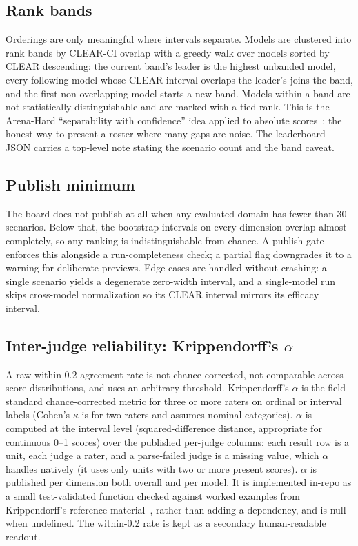 \subsection{Rank bands}

Orderings are only meaningful where intervals separate. Models are clustered into
rank bands by CLEAR-CI overlap with a greedy walk over models sorted by CLEAR
descending: the current band's leader is the highest unbanded model, every
following model whose CLEAR interval overlaps the leader's joins the band, and the
first non-overlapping model starts a new band. Models within a band are not
statistically distinguishable and are marked with a tied rank. This is the
Arena-Hard ``separability with confidence'' idea applied to absolute
scores~\cite{arenahard2024}: the honest way to present a roster where many gaps are
noise. The leaderboard JSON carries a top-level note stating the scenario count and
the band caveat.

\subsection{Publish minimum}

The board does not publish at all when any evaluated domain has fewer than 30
scenarios. Below that, the bootstrap intervals on every dimension overlap almost
completely, so any ranking is indistinguishable from chance. A publish gate
enforces this alongside a run-completeness check; a partial flag downgrades it to a
warning for deliberate previews. Edge cases are handled without crashing: a single
scenario yields a degenerate zero-width interval, and a single-model run skips
cross-model normalization so its CLEAR interval mirrors its efficacy interval.

\subsection{Inter-judge reliability: Krippendorff's $\alpha$}

A raw within-0.2 agreement rate is not chance-corrected, not comparable across
score distributions, and uses an arbitrary threshold. Krippendorff's $\alpha$ is the
field-standard chance-corrected metric for three or more raters on ordinal or
interval labels (Cohen's $\kappa$ is for two raters and assumes nominal categories).
$\alpha$ is computed at the interval level (squared-difference distance, appropriate
for continuous 0--1 scores) over the published per-judge columns: each result row
is a unit, each judge a rater, and a parse-failed judge is a missing value, which
$\alpha$ handles natively (it uses only units with two or more present scores).
$\alpha$ is published per dimension both overall and per model. It is implemented
in-repo as a small test-validated function checked against worked examples from
Krippendorff's reference material~\cite{krippendorff2011}, rather than adding a
dependency, and is null when undefined. The within-0.2 rate is kept as a secondary
human-readable readout.

